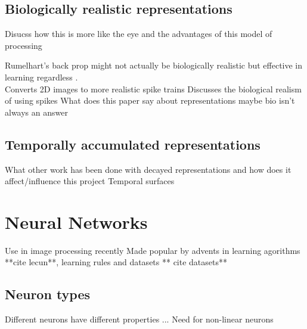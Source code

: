 

\subsection{Biologically realistic representations}
% 
Disucss how this is more like the eye and the advantages of this model of processing \cite{mahowald1992vlsi}

Rumelhart's back prop might not actually be biologically realistic but effective in learning regardless \cite{Rumelhart1986}. \\
Converts 2D images to more realistic spike trains \cite{afshar2013ripple}
Discusses the biological realism of using spikes \cite{akolkar2015can}
What does this paper say about representations maybe bio isn't always an answer \cite{fida2015pre}

\subsection{Temporally accumulated representations}  %
What other work has been done with decayed representations and how does it affect/influence this project
Temporal surfaces \cite{afshar2016investigation}




\section{Neural Networks}     %
Use in image processing recently
Made popular by advents in learning agorithms **cite lecun**, learning rules  \cite{Rumelhart1986} and datasets ** cite datasets**

\subsection{Neuron types}
Different neurons have different properties ...
Need for non-linear neurons

